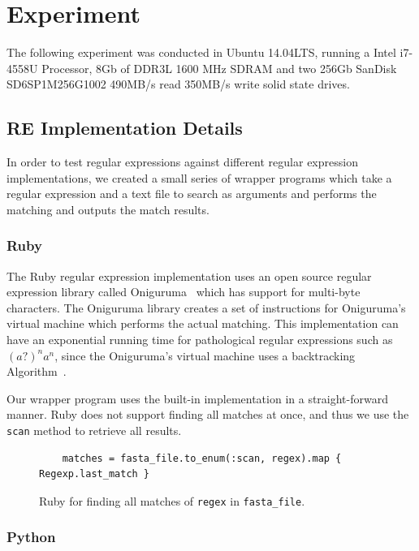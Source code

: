 \documentclass[12pt]{article}
\theoremstyle{definition}
\begin{document}
\section{Experiment}

The following experiment was conducted in Ubuntu 14.04LTS, running a Intel i7-4558U Processor, 8Gb of DDR3L 1600 MHz SDRAM and two 256Gb SanDisk SD6SP1M256G1002 490MB/s read 350MB/s write solid state drives.

\subsection{RE Implementation Details}

In order to test regular expressions against different regular expression implementations, we created a small series of wrapper programs which take a regular expression and a text file to search as arguments and performs the matching and outputs the match results.

\subsubsection{Ruby}

The Ruby regular expression implementation uses an open source regular expression library called Oniguruma~\cite{oniguruma} which has support for multi-byte characters. The Oniguruma library creates a set of instructions for Oniguruma's virtual machine which performs the actual matching. This implementation can have an exponential running time for pathological regular expressions such as $(a?)^na^n$, since the Oniguruma's virtual machine uses a backtracking Algorithm~\cite{oniguruma-overview}.

Our wrapper program uses the built-in implementation in a straight-forward manner. Ruby does not support finding all matches at once, and thus we use the \texttt{scan} method to retrieve all results.

\begin{figure}[H]
	\begin{lstlisting}
	matches = fasta_file.to_enum(:scan, regex).map { Regexp.last_match }
	\end{lstlisting}
	\caption{Ruby for finding all matches of \texttt{regex} in \texttt{fasta\_file}.}
\end{figure}

\subsubsection{Python}
\end{document}
